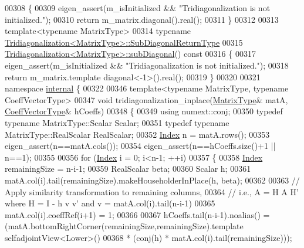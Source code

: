\begin{DoxyCode}
00308 \textcolor{keyword}{}\{
00309   eigen\_assert(m\_isInitialized && \textcolor{stringliteral}{"Tridiagonalization is not initialized."});
00310   \textcolor{keywordflow}{return} m\_matrix.diagonal().real();
00311 \}
00312 
00313 \textcolor{keyword}{template}<\textcolor{keyword}{typename} MatrixType>
00314 \textcolor{keyword}{typename} \hyperlink{class_eigen_1_1internal_1_1_tensor_lazy_evaluator_writable}{Tridiagonalization<MatrixType>::SubDiagonalReturnType}
00315 \hyperlink{group___eigenvalues___module_ac423dbb91157c159bdcb4b5a8371232e}{Tridiagonalization<MatrixType>::subDiagonal}()\textcolor{keyword}{ const}
00316 \textcolor{keyword}{}\{
00317   eigen\_assert(m\_isInitialized && \textcolor{stringliteral}{"Tridiagonalization is not initialized."});
00318   \textcolor{keywordflow}{return} m\_matrix.template diagonal<-1>().real();
00319 \}
00320 
00321 \textcolor{keyword}{namespace }\hyperlink{namespaceinternal}{internal} \{
00322 
00346 \textcolor{keyword}{template}<\textcolor{keyword}{typename} MatrixType, \textcolor{keyword}{typename} CoeffVectorType>
00347 \textcolor{keywordtype}{void} tridiagonalization\_inplace(\hyperlink{group___eigenvalues___module_add0f4b2216d0ea8ee0f7d8525deaf0a9}{MatrixType}& matA, \hyperlink{group___core___module}{CoeffVectorType}& hCoeffs)
00348 \{
00349   \textcolor{keyword}{using} numext::conj;
00350   \textcolor{keyword}{typedef} \textcolor{keyword}{typename} MatrixType::Scalar Scalar;
00351   \textcolor{keyword}{typedef} \textcolor{keyword}{typename} MatrixType::RealScalar RealScalar;
00352   \hyperlink{group___eigenvalues___module_a7bd1f9fccec1e93b77a2214b2d30aae9}{Index} n = matA.rows();
00353   eigen\_assert(n==matA.cols());
00354   eigen\_assert(n==hCoeffs.size()+1 || n==1);
00355   
00356   \textcolor{keywordflow}{for} (\hyperlink{group___eigenvalues___module_a7bd1f9fccec1e93b77a2214b2d30aae9}{Index} i = 0; i<n-1; ++i)
00357   \{
00358     \hyperlink{group___eigenvalues___module_a7bd1f9fccec1e93b77a2214b2d30aae9}{Index} remainingSize = n-i-1;
00359     RealScalar beta;
00360     Scalar h;
00361     matA.col(i).tail(remainingSize).makeHouseholderInPlace(h, beta);
00362 
00363     \textcolor{comment}{// Apply similarity transformation to remaining columns,}
00364     \textcolor{comment}{// i.e., A = H A H' where H = I - h v v' and v = matA.col(i).tail(n-i-1)}
00365     matA.col(i).coeffRef(i+1) = 1;
00366 
00367     hCoeffs.tail(n-i-1).noalias() = (matA.bottomRightCorner(remainingSize,remainingSize).template 
      selfadjointView<Lower>()
00368                                   * (conj(h) * matA.col(i).tail(remainingSize)));

\end{DoxyCode}
